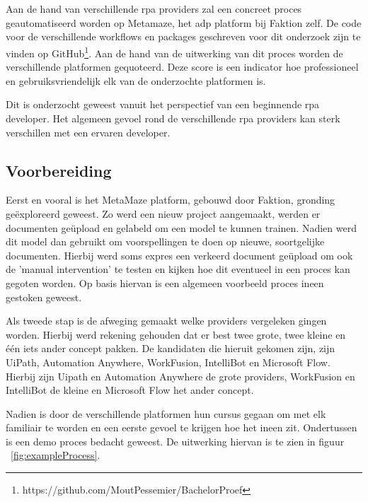 
\chapter{}
\label{ch:methodologie}

Aan de hand van verschillende \acrshort{rpa} providers zal een concreet proces geautomatiseerd worden op Metamaze, het \acrfull{adp} platform bij Faktion zelf. De code voor de verschillende workflows en packages geschreven voor dit onderzoek zijn te vinden op GitHub\footnote{https://github.com/MoutPessemier/BachelorProef}. Aan de hand van de uitwerking van dit proces worden de verschillende platformen gequoteerd. Deze score is een indicator hoe professioneel en gebruiksvriendelijk elk van de onderzochte platformen is.

Dit is onderzocht geweest vanuit het perspectief van een beginnende \acrshort{rpa} developer. Het algemeen gevoel rond de verschillende \acrshort{rpa} providers kan sterk verschillen met een ervaren developer.


\section{Voorbereiding}
Eerst en vooral is het MetaMaze platform, gebouwd door Faktion, gronding geëxploreerd geweest. Zo werd een nieuw project aangemaakt, werden er documenten geüpload en gelabeld om een model te kunnen trainen. Nadien werd dit model dan gebruikt om voorspellingen te doen op nieuwe, soortgelijke documenten. Hierbij werd soms expres een verkeerd document geüpload om ook de 'manual intervention' te testen en kijken hoe dit eventueel in een proces kan gegoten worden. Op basis hiervan is een algemeen voorbeeld proces ineen gestoken geweest.

Als tweede stap is de afweging gemaakt welke providers vergeleken gingen worden. Hierbij werd rekening gehouden dat er best twee grote, twee kleine en één iets ander concept pakken. De kandidaten die hieruit gekomen zijn, zijn UiPath, Automation Anywhere, WorkFusion, IntelliBot en Microsoft Flow. Hierbij zijn Uipath en Automation Anywhere de grote providers, WorkFusion en IntelliBot de kleine en Microsoft Flow het ander concept.

Nadien is door de verschillende platformen hun cursus gegaan om met elk familiair te worden en een eerste gevoel te krijgen hoe het ineen zit. Ondertussen is een demo proces bedacht geweest. De uitwerking hiervan is te zien in figuur ~\ref{fig:exampleProcess}.

